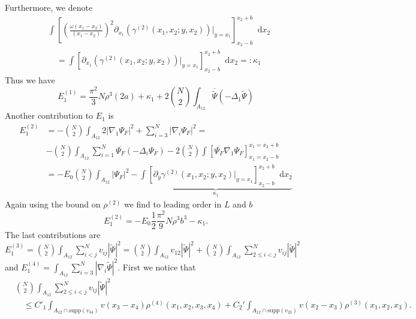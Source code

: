 \documentclass[a4paper,11pt]{article}
\newcommand{\supp}{\text{supp}}
\newcommand{\abs}[1]{\left\lvert #1 \right\rvert}
\newcommand*\diff{\mathop{}\!\mathrm{d}}
\numberwithin{equation}{section}
\begin{document}
		Furthermore, we denote \begin{equation}\label{EqGammaDeriv2.}
		\begin{aligned}
		&\int\left[\left(\frac{\omega(x_1-x_2)}{(x_1-x_2)}\right)^2\partial_{x_1}\left(\gamma^{(2)}(x_1,x_2;y,x_2)\right)\bigg\vert_{y=x_1}\right]_{x_2-b}^{x_2+b}\diff x_2\\
		&\quad=\int\left[\partial_{x_1}\left(\gamma^{(2)}(x_1,x_2;y,x_2)\right)\bigg\vert_{y=x_1}\right]_{x_2-b}^{x_2+b}\diff x_2=:\kappa_1
		\end{aligned}
		\end{equation}
		Thus we have \begin{equation}
		E_1^{(1)}=\frac{\pi^2}{3}N\rho^3 (2a)+\kappa_1+2\binom{N}{2}\int_{A_{12}}\overline{\tilde{\Psi}}(-\Delta_1\tilde{\Psi})
		\end{equation}
		Another contribution to $ E_1 $ is \begin{equation}
		\begin{aligned}
		E_1^{(2)}&=-\binom{N}{2}\int_{A_{12}}2\abs{\nabla_1\Psi_F}^2+\sum_{i=3}^{N}\abs{\nabla_i\Psi_F}^2=\\&-\binom{N}{2}\int_{A_{12}}\sum_{i=1}^{N}\overline{\Psi_F}(-\Delta_i\Psi_F)-2\binom{N}{2}\int\left[\overline{\Psi_F}\nabla_1\Psi_F\right]_{x_1=x_2-b}^{x_1=x_2+b}\\
		&=-E_0\binom{N}{2}\int_{A_{12}}\abs{\Psi_F}^2-\underbrace{\int\left[\partial_y\gamma^{(2)}(x_1,x_2;y,x_2)\vert_{y=x_1}\right]_{x_2-b}^{x_2+b} \diff x_2}_{\kappa_1}
		\end{aligned}
		\end{equation}
		Again using the bound on $ \rho^{(2)} $ we find to leading order in $ L $ and $ b $ \begin{equation}
		E_1^{(2)}=-E_0\frac{1}{2}\frac{\pi^2}{9}N\rho^3b^3-\kappa_1.
		\end{equation}
		The last contributions are $ E^{(3)}_1=\binom{N}{2}\int_{A_{12}} \sum_{i<j}^{N}v_{ij}\abs{\tilde{\Psi}}^2=\binom{N}{2}\int_{A_{12}}v_{12}\abs{\tilde{\Psi}}^2+\binom{N}{2}\int_{A_{12}} \sum_{2\leq i<j}^{N}v_{ij}\abs{\tilde{\Psi}}^2 $ and $ E_1^{(4)}=\int_{A_{12}}\sum_{i=3}^{N}\abs{\nabla_i\tilde{\Psi}}^2 $.
		First we notice that \begin{equation}
		\begin{aligned}
		&\binom{N}{2}\int_{A_{12}} \sum_{2\leq i<j}^{N}v_{ij}\abs{\tilde{\Psi}}^2\\&\quad\leq C'_1\int_{A_{12}\cap\supp(v_{34})}v(x_3-x_4)\rho^{(4)}(x_1,x_2,x_3,x_4)+C_2'\int_{A_{12}\cap\supp(v_{23})}v(x_2-x_3)\rho^{(3)}(x_1,x_2,x_3).
		\end{aligned}
		\end{equation}
\end{document}

